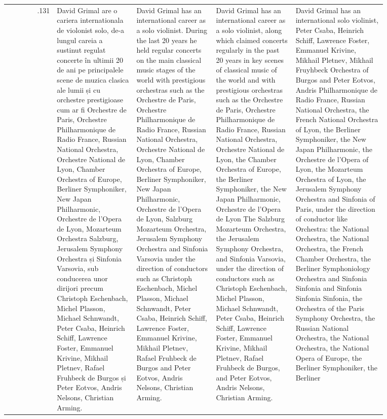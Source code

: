 \begin{table}[ht]
\begin{tabular}{r @{\hspace{1mm}} p{0.21\linewidth}p{0.21\linewidth}p{0.21\linewidth}p{0.24\linewidth}}
.131 & David Grimal are o cariera internationala de violonist solo, de-a lungul careia a sustinut regulat concerte în ultimii 20 de ani pe principalele scene de muzica clasica ale lumii și cu orchestre prestigioase cum ar fi Orchestre de Paris, Orchestre Philharmonique de Radio France, Russian National Orchestra, Orchestre National de Lyon, Chamber Orchestra of Europe, Berliner Symphoniker, New Japan Philharmonic, Orchestre de l'Opera de Lyon, Mozarteum Orchestra Salzburg, Jerusalem Symphony Orchestra și Sinfonia Varsovia, sub conducerea unor dirijori precum Christoph Eschenbach, Michel Plasson, Michael Schnwandt, Peter Csaba, Heinrich Schiff, Lawrence Foster, Emmanuel Krivine, Mikhail Pletnev, Rafael Fruhbeck de Burgos și Peter Eotvos, Andris Nelsons, Christian Arming. & David Grimal has an international career as a solo violinist. During the last 20 years he held regular concerts on the main classical music stages of the world with prestigious orchestras such as the Orchestre de Paris, Orchestre Philharmonique de Radio France, Russian National Orchestra, Orchestre National de Lyon, Chamber Orchestra of Europe, Berliner Symphoniker, New Japan Philharmonic, Orchestre de l'Opera de Lyon, Salzburg Mozarteum Orchestra, Jerusalem Symphony Orchestra and Sinfonia Varsovia under the direction of conductors such as Christoph Eschenbach, Michel Plasson, Michael Schnwandt, Peter Csaba, Heinrich Schiff, Lawrence Foster, Emmanuel Krivine, Mikhail Pletnev, Rafael Fruhbeck de Burgos and Peter Eotvos, Andris Nelsons, Christian Arming. & David Grimal has an international career as a solo violinist, along which claimed concerts regularly in the past 20 years in key scenes of classical music of the world and with prestigious orchestras such as the Orchestre de Paris, Orchestre Philharmonique de Radio France, Russian National Orchestra, Orchestre National de Lyon, the Chamber Orchestra of Europe, the Berliner Symphoniker, the New Japan Philharmonic, Orchestre de l'Opera de Lyon The Salzburg Mozarteum Orchestra, the Jerusalem Symphony Orchestra, and Sinfonia Varsovia, under the direction of conductors such as Christoph Eschenbach, Michel Plasson, Michael Schnwandt, Peter Csaba, Heinrich Schiff, Lawrence Foster, Emmanuel Krivine, Mikhail Pletnev, Rafael Fruhbeck de Burgos, and Peter Eotvos, Andris Nelsons, Christian Arming. & David Grimal has an international solo violinist, Peter Csaba, Heinrich Schiff, Lawrence Foster, Emmanuel Krivine, Mikhail Pletnev, Mikhail Fruyhbeck Orchestra of Burgos and Peter Eotvos, Andris Philharmonique de Radio France, Russian National Orchestra, the French National Orchestra of Lyon, the Berliner Symphoniker, the New Japan Philharmonic, the Orchestre de l'Opera of Lyon, the Mozarteum Orchestra of Lyon, the Jerusalem Symphony Orchestra and Sinfonia of Paris, under the direction of conductor like Orchestra: the National Orchestra, the National Orchestra, the French Chamber Orchestra, the Berliner Symphoniology Orchestra and Sinfonia Sinfonia and Sinfonia Sinfonia Sinfonia, the Orchestra of the Paris Symphony Orchestra, the Russian National Orchestra, the National Orchestra, the National Opera of Europe, the Berliner Symphoniker, the Berliner 
\end{tabular}
\end{table}
